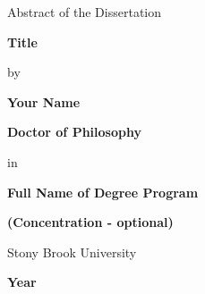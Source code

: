 
\centerline{Abstract of the Dissertation}
\vspace*{1\baselineskip}
\centerline{\textbf{Title}}
\vspace*{1\baselineskip}
\centerline{by}
\vspace*{1\baselineskip}
\centerline{\textbf{Your Name}}
\vspace*{1\baselineskip}
\centerline{\textbf{Doctor of Philosophy}}
\vspace*{1\baselineskip}
\centerline{in}
\vspace*{1\baselineskip}
\centerline{\textbf{Full Name of Degree Program}}
\vspace*{1\baselineskip}
\centerline{\textbf{(Concentration - optional)}}
\vspace*{1\baselineskip}
\centerline{Stony Brook University}
\vspace*{1\baselineskip}
\centerline{\textbf{Year}}
\vspace*{2\baselineskip}
\lipsum[1]